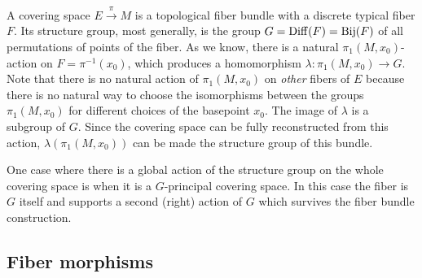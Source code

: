 \begin{example}
    A covering space $E\overset{\pi}{\to} M$ is a topological fiber bundle with a discrete typical fiber $F$. Its structure group, most generally, is the group $G=\operatorname{Diff}(F)=\mathrm{Bij}(F)$ of all permutations of points of the fiber. As we know, there is a natural $\pi_1(M,x_0)$-action on $F=\pi^{-1}(x_0)$, which produces a homomorphism $\lambda:\pi_1(M,x_0)\to G$. Note that there is no natural action of $\pi_1(M,x_0)$ on \emph{other} fibers of $E$ because there is no natural way to choose the isomorphisms between the groups $\pi_1(M,x_0)$ for different choices of the basepoint $x_0$. The image of $\lambda$ is a subgroup of $G$. Since the covering space can be fully reconstructed from this action, $\lambda(\pi_1(M,x_0))$ can be made the structure group of this bundle. 
    
    One case where there is a global action of the structure group on the whole covering space is when it is a $G$-principal covering space. In this case the fiber is $G$ itself and supports a second (right) action of $G$ which survives the fiber bundle construction.
\end{example}






\subsection{Fiber morphisms}\label{sec: fiber morphisms}


